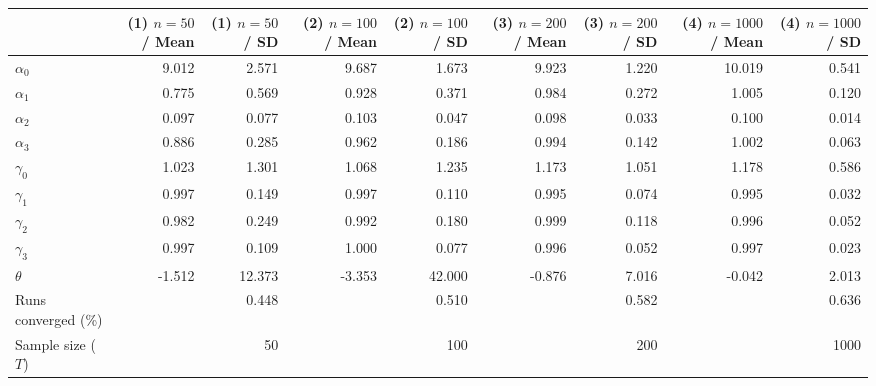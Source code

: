 
\begin{tabular}[t]{lrrrrrrrr}
\toprule
  & (1) $n=50$ / Mean & (1) $n=50$ / SD & (2) $n=100$ / Mean & (2) $n=100$ / SD & (3) $n=200$ / Mean & (3) $n=200$ / SD & (4) $n=1000$ / Mean & (4) $n=1000$ / SD\\
\midrule
$\alpha_{0}$ & 9.012 & 2.571 & 9.687 & 1.673 & 9.923 & 1.220 & 10.019 & 0.541\\
$\alpha_{1}$ & 0.775 & 0.569 & 0.928 & 0.371 & 0.984 & 0.272 & 1.005 & 0.120\\
$\alpha_{2}$ & 0.097 & 0.077 & 0.103 & 0.047 & 0.098 & 0.033 & 0.100 & 0.014\\
$\alpha_{3}$ & 0.886 & 0.285 & 0.962 & 0.186 & 0.994 & 0.142 & 1.002 & 0.063\\
$\gamma_{0}$ & 1.023 & 1.301 & 1.068 & 1.235 & 1.173 & 1.051 & 1.178 & 0.586\\
$\gamma_{1}$ & 0.997 & 0.149 & 0.997 & 0.110 & 0.995 & 0.074 & 0.995 & 0.032\\
$\gamma_{2}$ & 0.982 & 0.249 & 0.992 & 0.180 & 0.999 & 0.118 & 0.996 & 0.052\\
$\gamma_{3}$ & 0.997 & 0.109 & 1.000 & 0.077 & 0.996 & 0.052 & 0.997 & 0.023\\
$\theta$ & -1.512 & 12.373 & -3.353 & 42.000 & -0.876 & 7.016 & -0.042 & 2.013\\
Runs converged (\%) &  & 0.448 &  & 0.510 &  & 0.582 &  & 0.636\\
Sample size ($T$) &  & 50 &  & 100 &  & 200 &  & 1000\\
\bottomrule
\end{tabular}
